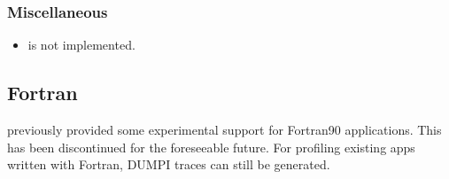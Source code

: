 \subsubsection{Miscellaneous}
\label{subsubsec:issues:mpi:misc}

\begin{itemize}
\item {} is not implemented.
\end{itemize}


\subsection{Fortran}
\label{subsec:issues:fortran}

\sstmacro previously provided some experimental support for Fortran90 applications. 
This has been discontinued for the foreseeable future.
For profiling existing apps written with Fortran, DUMPI traces can still be generated. 

